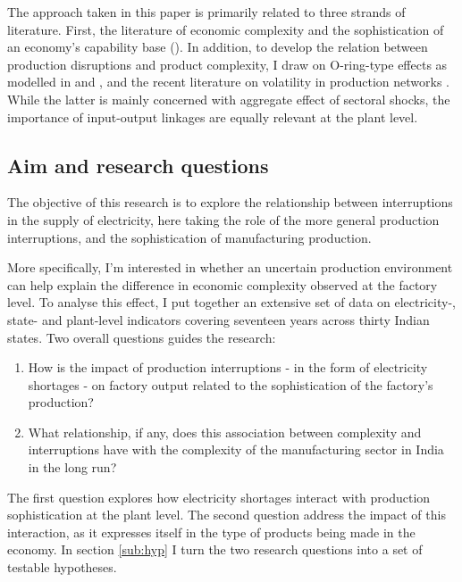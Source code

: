 \documentclass[11pt]{article}
\begin{document}
The approach taken in this paper is primarily related to three strands of literature. First, the literature of economic complexity and the sophistication of an economy's capability base  (\citealp{frenken_related_2007,hausmann_atlas_2013,tacchella_new_2012}). In addition, to develop the relation between production disruptions and product complexity, I draw on O-ring-type effects as modelled in \cite{kremer_o-ring_1993} and \cite{jones_intermediate_2011}, and the recent literature on volatility in production networks \citep{acemoglu_network_2012}. While the latter is mainly concerned with aggregate effect of sectoral shocks, the importance of input-output linkages are equally relevant at the plant level.

\subsection{Aim and research questions}%
\label{sub:aim_and_research_questions}
The objective of this research is to explore the relationship between interruptions in the supply of electricity, here taking the role of the more general production interruptions, and the sophistication of manufacturing production.

More specifically, I'm interested in whether an uncertain production environment can help explain the difference in economic complexity observed at the factory level. To analyse this effect, I put together an extensive set of data on electricity-, state- and plant-level indicators covering seventeen years across thirty Indian states. Two overall questions guides the research: 

\begin{enumerate}

\item How is the impact of production interruptions - in the form of electricity shortages - on factory output related to the sophistication of the factory's production?

\item What relationship, if any, does this association between complexity and interruptions have with the complexity of the manufacturing sector in India in the long run?

\end{enumerate}

The first question explores how electricity shortages interact with production sophistication at the plant level. The second question address the impact of this interaction, as it expresses itself in the type of products being made in the economy. In section \ref{sub:hyp} I turn the two research questions into a set of testable hypotheses.
\end{document}
